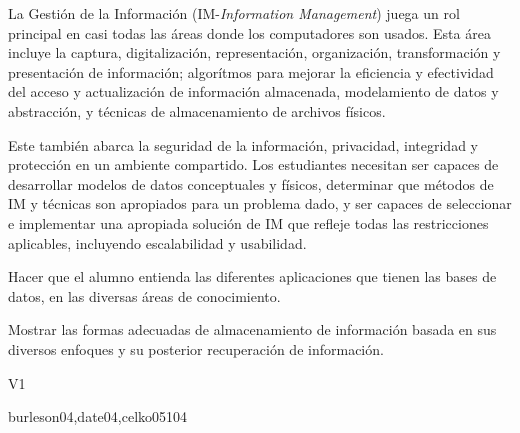 \begin{syllabus}


\begin{justification}
    La Gestión de la Información (IM-\textit{Information Management}) juega un rol principal en casi todas las áreas donde los computadores son usados. Esta área incluye la captura, digitalización, representación, organización, transformación y presentación de información; algorítmos para mejorar la eficiencia y efectividad del acceso y actualización de información almacenada, modelamiento de datos y abstracción, y técnicas de almacenamiento de archivos físicos.
    
    Este también abarca la seguridad de la información, privacidad, integridad y protección en un ambiente compartido. Los estudiantes necesitan ser capaces de desarrollar modelos de datos conceptuales y físicos, determinar que métodos de IM y técnicas son apropiados para un problema dado, y ser capaces de seleccionar e implementar una apropiada solución de IM que refleje todas las restricciones aplicables, incluyendo escalabilidad y usabilidad.
    \end{justification}
    
    \begin{goals}
    \item Hacer que el alumno entienda las diferentes aplicaciones que tienen las bases de datos, en las diversas áreas de conocimiento.
    \item Mostrar las formas adecuadas de almacenamiento de información basada en sus diversos enfoques y su posterior recuperación de información.
    \end{goals}
    
    \begin{outcomes}{V1}
        \item {}
        \item {}
        \item {}
        \item {}
        \item {}
    \end{outcomes}
    
    \begin{unit}{\IMPhysicalDatabaseDesign}{}{burleson04,date04,celko05}{10}{4}
        \IMPhysicalDatabaseDesignAllTopics%
        \IMPhysicalDatabaseDesignAllLearningOutcomes
    \end{unit}
    

\end{syllabus}
